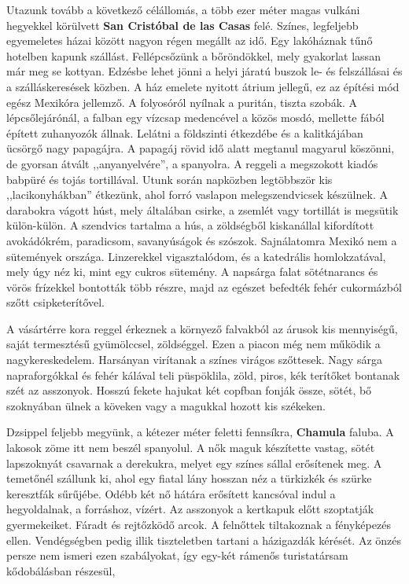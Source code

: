 Utazunk tovább a következő célállomás, a több ezer méter magas
vulkáni hegyekkel körülvett \textbf{San Cristóbal de las Casas} felé.
Színes, legfeljebb egyemeletes házai között nagyon régen megállt az idő.
Egy lakóháznak tűnő hotelben kapunk szállást. Fellépcsőzünk a bőröndökkel,
mely gyakorlat lassan már meg se kottyan. Edzésbe lehet jönni
a helyi járatú buszok le- és felszállásai és a szálláskeresések közben.
A ház emelete nyitott átrium jellegű, ez az építési mód egész Mexikóra
jellemző. A folyosóról nyílnak a puritán, tiszta szobák. A lépcsőlejárónál,
a falban egy vízcsap medencével a közös mosdó, mellette
fából épített zuhanyozók állnak. Lelátni a földszinti étkezdébe és a
kalitkájában ücsörgő nagy papagájra. A papagáj rövid idő alatt megtanul
magyarul köszönni, de gyorsan átvált ,,anyanyelvére'', a spanyolra.
A reggeli a megszokott kiadós babpüré és tojás tortillával. Utunk
során napközben legtöbbször kis ,,lacikonyhákban'' étkezünk, ahol
forró vaslapon melegszendvicsek készülnek. A darabokra vágott húst,
mely általában csirke, a zsemlét vagy tortillát is megsütik külön-külön.
A szendvics tartalma a hús, a zöldségből kiskanállal kifordított
avokádókrém, paradicsom, savanyúságok és szószok. Sajnálatomra Mexikó
nem a sütemények országa. Linzerekkel vigasztalódom, és a katedrális
homlokzatával, mely úgy néz ki, mint egy cukros sütemény. A napsárga
falat sötétnarancs és vörös frízekkel bontották több részre, majd
az egészet befedték fehér cukormázból szőtt csipketerítővel.


A vásártérre kora reggel érkeznek a környező falvakból az árusok
kis mennyiségű, saját termesztésű gyümölccsel, zöldséggel. Ezen a
piacon még nem működik a nagykereskedelem. Harsányan virítanak a
színes virágos szőttesek. Nagy sárga napraforgókkal és fehér kálával
teli püspöklila, zöld, piros, kék terítőket bontanak szét az asszonyok.
Hosszú fekete hajukat két copfban fonják össze, sötét, bő szoknyában
ülnek a köveken vagy a magukkal hozott kis székeken.

Dzsippel feljebb megyünk, a kétezer méter feletti fennsíkra, \textbf{%
Chamula} faluba. A lakosok zöme itt nem beszél spanyolul. A nők maguk
készítette vastag, sötét lapszoknyát csavarnak a derekukra, melyet egy
színes sállal erősítenek meg. A temetőnél szállunk ki, ahol egy fiatal
lány hosszan néz a türkizkék és szürke keresztfák sűrűjébe. Odébb
két nő hátára erősített kancsóval indul a hegyoldalnak, a forráshoz,
vízért. Az asszonyok a kertkapuk előtt szoptatják gyermekeiket. Fáradt
és rejtőzködő arcok. A felnőttek tiltakoznak a fényképezés ellen.
Vendégségben pedig illik tiszteletben tartani a házigazdák kérését. Az
önzés persze nem ismeri ezen szabályokat, így egy-két rámenős turistatársam
kődobálásban részesül,

